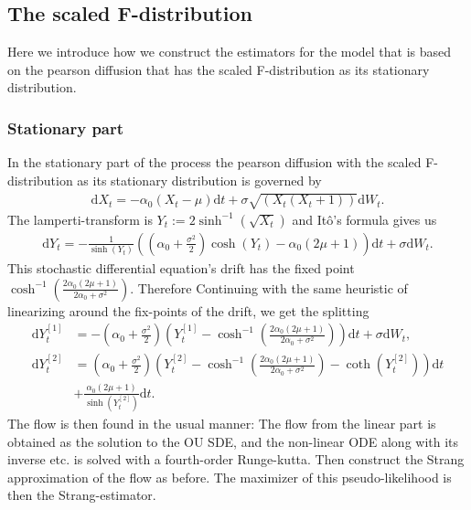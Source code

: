 \subsection{The scaled F-distribution}
Here we introduce how we construct the estimators for the model that is based on the pearson diffusion that has the scaled F-distribution as its stationary distribution. 
\subsubsection{Stationary part}
In the stationary part of the process the pearson diffusion with the scaled F-distribution as its stationary distribution is governed by
\begin{align}
    \mathrm{d}X_t = -\alpha_0\left(X_t - \mu\right)\mathrm{d}t + \sigma \sqrt{\left(X_t\left(X_t + 1\right)\right)}\mathrm{d}W_t.
\end{align}
The lamperti-transform is $Y_t := 2 \sinh^{-1}\left(\sqrt{X_t}\right)$ and Itô's formula gives us
\begin{align}
    \mathrm{d}Y_t = - \frac{1}{\sinh(Y_t)}\left(\left(\alpha_0 + \frac{\sigma^2}{2}\right)\cosh(Y_t) - \alpha_0\left(2\mu + 1\right)\right) \mathrm{d}t + \sigma \mathrm{d}W_t. \label{eq:F_diffusion_lamperti_SDE}
\end{align}
This stochastic differential equation's drift has the fixed point $\cosh^{-1}\left(\frac{2\alpha_0\left(2\mu + 1\right)}{2\alpha_0 + \sigma^2}\right)$.
Therefore Continuing with the same heuristic of linearizing around the fix-points of the drift, we get the splitting
\begin{align}
    \mathrm{d}Y_t^{[1]} &= -\left(\alpha_0 + \frac{\sigma^2}{2}\right)\left(Y_t^{[1]} - \cosh^{-1}\left(\frac{2\alpha_0\left(2\mu + 1\right)}{2\alpha_0 + \sigma^2}\right)\right)\mathrm{d}t + \sigma \mathrm{d}W_t, \\
    \mathrm{d}Y_t^{[2]} &= \left(\alpha_0 + \frac{\sigma^2}{2}\right) \left(Y_t^{[2]} - \cosh^{-1}\left(\frac{2\alpha_0\left(2\mu + 1\right)}{2\alpha_0 + \sigma^2}\right) - \coth\left(Y_t^{[2]}\right) \right)\mathrm{d}t\nonumber\\
    &+ \frac{\alpha_0\left(2\mu + 1\right)}{\sinh(Y_t^{[2]})}\mathrm{d}t. \label{eq:scaledFStrang}
\end{align}
The flow is then found in the usual manner: The flow from the linear part is obtained as the solution to the OU SDE, and the non-linear ODE along with its inverse etc. is solved with a fourth-order Runge-kutta. Then construct the Strang approximation of the flow as before. The maximizer of this pseudo-likelihood is then the Strang-estimator.  
